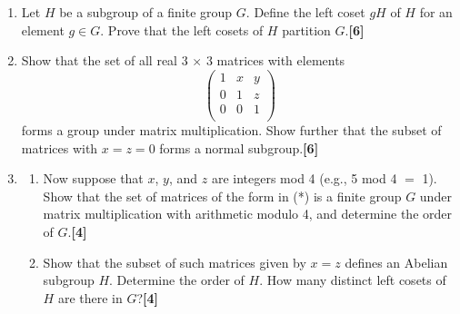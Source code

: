 \documentclass[a4paper]{article}
\begin{document}
\newpage
\begin{qns}\leavevmode
\begin{enumerate}[label=(\alph*)]
\item Let $H$ be a subgroup of a finite group $G$. Define the left coset $gH$ of $H$ for an element $g\in G$. Prove that the left cosets of $H$ partition $G$.\hfill\textbf{[6]}
\item Show that the set of all real 3 $\times$ 3 matrices with elements
\begin{equation}
    \begin{pmatrix}1&x&y\\0&1&z\\0&0&1\\\end{pmatrix}\tag{*}
\end{equation}
forms a group under matrix multiplication. Show further that the subset of matrices with $x = z = 0$ forms a normal subgroup.\hfill\textbf{[6]}
\item 
\begin{enumerate}[label=(\roman*)]
\item Now suppose that $x$, $y$, and $z$ are integers mod 4 (e.g., 5 mod 4 $=$ 1). Show that the set of matrices of the form in (*) is a finite group $G$ under matrix multiplication with arithmetic modulo 4, and determine the order of $G$.\hfill\textbf{[4]}
\item Show that the subset of such matrices given by $x = z$ defines an Abelian subgroup $H$. Determine the order of $H$. How many distinct left cosets of $H$ are there in $G$?\hfill\textbf{[4]}
\end{enumerate}
\end{enumerate}
\end{qns}
\end{document}
